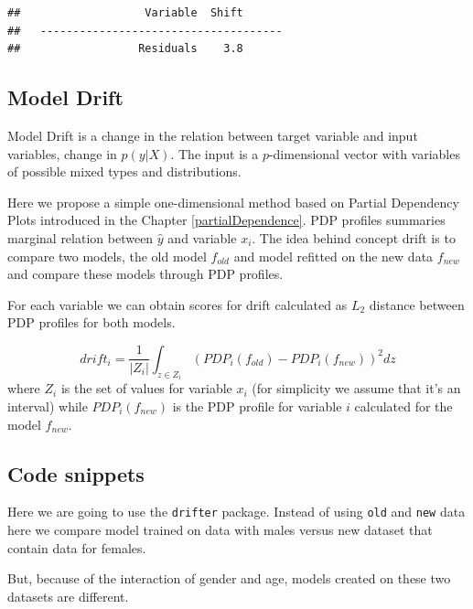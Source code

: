 \documentclass[]{krantz}
\theoremstyle{definition}
\theoremstyle{definition}
\theoremstyle{definition}
\theoremstyle{remark}
\begin{document}
\begin{verbatim}
##                   Variable  Shift
##   -------------------------------------
##                  Residuals    3.8
\end{verbatim}

\hypertarget{model-drift}{%
\subsection{Model Drift}\label{model-drift}}

Model Drift is a change in the relation between target variable and
input variables, change in \(p(y|X)\). The input is a \(p\)-dimensional
vector with variables of possible mixed types and distributions.

Here we propose a simple one-dimensional method based on Partial
Dependency Plots introduced in the Chapter \ref{partialDependence}. PDP
profiles summaries marginal relation between \(\hat y\) and variable
\(x_i\). The idea behind concept drift is to compare two models, the old
model \(f_{old}\) and model refitted on the new data \(f_{new}\) and
compare these models through PDP profiles.

For each variable we can obtain scores for drift calculated as \(L_2\)
distance between PDP profiles for both models.

\[
drift_{i} = \frac 1 {|Z_i|}\int_{z\in Z_i} (PDP_i(f_{old}) - PDP_i(f_{new}))^2 dz
\] where \(Z_i\) is the set of values for variable \(x_i\) (for
simplicity we assume that it's an interval) while \(PDP_i(f_{new})\) is
the PDP profile for variable \(i\) calculated for the model \(f_{new}\).

\hypertarget{code-snippets-4}{%
\subsection{Code snippets}\label{code-snippets-4}}

Here we are going to use the \texttt{drifter} package. Instead of using
\texttt{old} and \texttt{new} data here we compare model trained on data
with males versus new dataset that contain data for females.

But, because of the interaction of gender and age, models created on
these two datasets are different.
\end{document}
